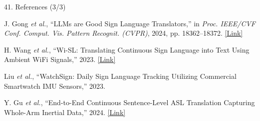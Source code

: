 \documentclass[aspectratio=169,11pt,xcolor=table]{beamer}
\begin{document}
\begin{frame}{41. References (3/3)}

\footnotesize
\color{black}
\raggedright

\begin{list}
    {}
    {
        \setlength{\leftmargin}{0.45cm}
        \setlength{\labelwidth}{0cm}
        \setlength{\labelsep}{0.10cm}
        \setlength{\itemsep}{8pt}
        \setlength{\parsep}{0pt}
        \setlength{\topsep}{0pt}
    }

\item[\textbf{[9]}]
J. Gong \emph{et al.}, ``LLMs are Good Sign Language Translators,''
in \emph{Proc. IEEE/CVF Conf. Comput. Vis. Pattern Recognit. (CVPR)},
2024, pp. 18362--18372.
\hspace{2pt}
\href{https://openaccess.thecvf.com/content/CVPR2024/html/Gong_LLMs_are_Good_Sign_Language_Translators_CVPR_2024_paper.html}
{\textcolor{AmritaMaroon}{[Link]}}

\item[\textbf{[10]}]
H. Wang \emph{et al.}, ``Wi-SL: Translating Continuous Sign Language
into Text Using Ambient WiFi Signals,'' 2023.
\hspace{2pt}
\href{https://www.mdpi.com/1424-8220/20/14/4025}
{\textcolor{AmritaMaroon}{[Link]}}

\item[\textbf{[11]}]
Liu \emph{et al.}, ``WatchSign: Daily Sign Language Tracking Utilizing
Commercial Smartwatch IMU Sensors,'' 2023.

\item[\textbf{[12]}]
Y. Gu \emph{et al.}, ``End-to-End Continuous Sentence-Level ASL
Translation Capturing Whole-Arm Inertial Data,'' 2024.
\hspace{2pt}
\href{https://www.mdpi.com/1424-8220/24/2/453}
{\textcolor{AmritaMaroon}{[Link]}}

\end{list}

\end{frame}
\end{document}
